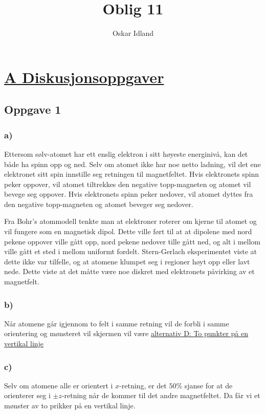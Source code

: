 \documentclass{article}
\author{Oskar Idland}
\title{Oblig 11}
\date{}
\begin{document}
\maketitle
\newpage
\section*{\underline{A Diskusjonsoppgaver}}
\subsection*{Oppgave 1}
\subsubsection*{a)}
Ettersom sølv-atomet har ett enslig elektron i sitt høyeste energinivå, kan det både ha spinn opp og ned. Selv om atomet ikke har noe netto ladning, vil det ene elektronet sitt spin innstille seg retningen til magnetfeltet. Hvis elektronets spinn peker oppover, vil atomet tiltrekkes den negative topp-magneten og atomet vil bevege seg oppover. Hvis elektronets spinn peker nedover, vil atomet dyttes fra den negative topp-magneten og atomet beveger seg nedover. 

Fra Bohr's atommodell tenkte man at elektroner roterer om kjerne til atomet og vil fungere som en magnetisk dipol. Dette ville ført til at at dipolene med nord pekene oppover ville gått opp, nord pekene nedover tille gått ned, og alt i mellom ville gått et sted i mellom uniformt fordelt. Stern-Gerlach eksperimentet viste at dette ikke var tilfelle, og at atomene klumpet seg i regioner høyt opp eller lavt nede. Dette viste at det måtte være noe diskret med elektronets påvirking av et magnetfelt. 

\subsubsection*{b)}
Når atomene går igjennom to felt i samme retning vil de forbli i samme orientering og mønsteret vil skjermen vil være \underline{alternativ D: To punkter på en vertikal linje}

\subsubsection*{c)}
Selv om atomene alle er orientert i $x$-retning, er det $50\%$ sjanse for at de orienterer seg i $± z$-retning når de kommer til det andre magnetfeltet. Da får vi et mønster av to prikker på en vertikal linje.
\end{document}
